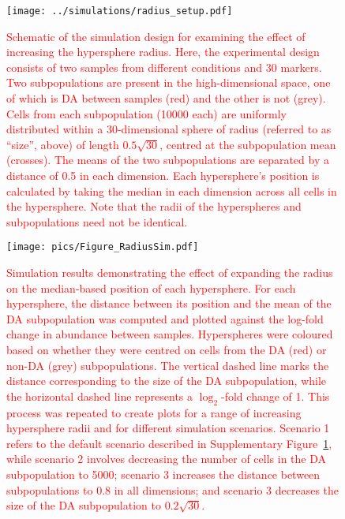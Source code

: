 \documentclass{article}
\newcommand\revised[1]{\textcolor{red}{#1}}
\begin{document}
\begin{figure}[tbp]
    \begin{center}
        \texttt{[image: ../simulations/radius\_setup.pdf]}
    \end{center}
    \caption{\revised{Schematic of the simulation design for examining the effect of increasing the hypersphere radius.
        Here, the experimental design consists of two samples from different conditions and 30 markers.
        Two subpopulations are present in the high-dimensional space, one of which is DA between samples (red) and the other is not (grey).
        Cells from each subpopulation (10000 each) are uniformly distributed within a 30-dimensional sphere of radius (referred to as ``size'', above) of length $0.5\sqrt{30}$, centred at the subpopulation mean (crosses).
        The means of the two subpopulations are separated by a distance of 0.5 in each dimension.
        Each hypersphere's position is calculated by taking the median in each dimension across all cells in the hypersphere.
        Note that the radii of the hyperspheres and subpopulations need not be identical.
    }
    }
    \label{fig:radius_schematic}
\end{figure}

\begin{figure}[tbp]
    \begin{center}
        \texttt{[image: pics/Figure\_RadiusSim.pdf]}
    \end{center}
    \caption{\revised{Simulation results demonstrating the effect of expanding the radius on the median-based position of each hypersphere.
        For each hypersphere, the distance between its position and the mean of the DA subpopulation was computed and plotted against the log-fold change in abundance between samples.
        Hyperspheres were coloured based on whether they were centred on cells from the DA (red) or non-DA (grey) subpopulations.
        The vertical dashed line marks the distance corresponding to the size of the DA subpopulation, while the horizontal dashed line represents a $\log_2$-fold change of 1.
        This process was repeated to create plots for a range of increasing hypersphere radii and for different simulation scenarios.
        Scenario 1 refers to the default scenario described in Supplementary Figure~\ref{fig:radius_schematic}, while scenario 2 involves decreasing the number of cells in the DA subpopulation to 5000; scenario 3 increases the distance between subpopulations to 0.8 in all dimensions; and scenario 3 decreases the size of the DA subpopulation to $0.2\sqrt{30}$.
    }
    }
    \label{fig:radius_position}
\end{figure}
\end{document}
